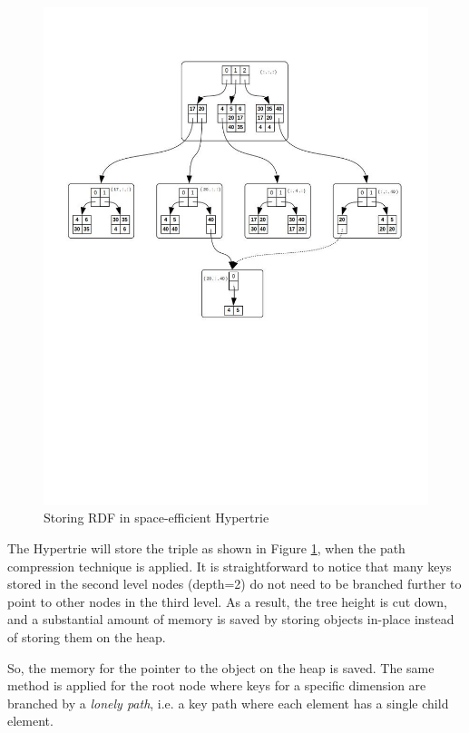 \begin{figure}[htbp]
	\centering
	\vspace{-1in}
	\includegraphics[width=1\textwidth]{figures/example.jpg}
	\caption{Storing RDF in space-efficient Hypertrie}
	\label{fig:example_compressed_trie}
\end{figure}

The Hypertrie will store the triple as shown in Figure \ref{fig:example_compressed_trie},  when the path compression technique is applied. It is straightforward to notice that many keys stored in the second level nodes (depth=2) do not need to be branched further to point to other nodes in the third level. 
As a result, the tree height is cut down, and a substantial amount of memory is saved by storing objects in-place instead of storing them on the heap. 

So, the memory for the pointer to the object on the heap is saved. 
The same method is applied for the root node where keys for a specific dimension are branched by a \textit{lonely path}, i.e. a key path where each element has a single child element. \\

